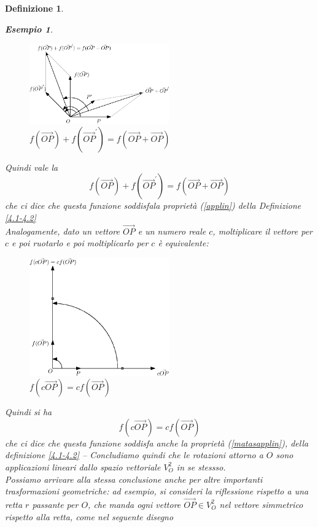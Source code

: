 \documentclass{book}
\newtheorem{definizione}{Definizione}
\newtheorem{esempio}{Esempio}
\begin{document}
\begin{definizione}
\begin{esempio}
    \clearpage
    \begin{figure}[th]
      \centering
        \includegraphics[width=6cm]{img/finiti/imgex4-2-2.eps}
      \caption{$f(\vec{OP})+f(\vec{OP}^\prime)=f(\vec{OP}+\vec{OP})$}
    \end{figure}
    Quindi vale la
    \begin{equation}
      f(\vec{OP})+f(\vec{OP}^\prime)=f(\vec{OP}+\vec{OP})
    \end{equation}
    che ci dice che questa funzione soddisfala proprietà (\ref{applin}) della Definizione \ref{4.1-4.2}\\
    Analogamente, dato un vettore $\vec{OP}$ e un numero reale $c$, moltiplicare il vettore per $c$ e poi
    ruotarlo e poi moltiplicarlo per $c$ è equivalente:
    \begin{figure}[th]
      \centering
        \includegraphics[width=6cm]{img/finiti/imgex4-2-3.eps}
      \caption{$f(c\vec{OP})=cf(\vec{OP})$}
    \end{figure}
    Quindi si ha
    \begin{equation}
      f(c\vec{OP})=cf(\vec{OP})
    \end{equation}
    che ci dice che questa funzione soddisfa anche la proprietà (\ref{matasapplin}), della definizione
    \ref{4.1-4.2} -- Concludiamo quindi che le rotazioni attorno a $O$ sono applicazioni lineari dallo
    spazio vettoriale $V_O^2$ in se stessso.\\
    Possiamo arrivare alla stessa conclusione anche per altre importanti trasformazioni geometriche: ad
    esempio, si consideri la riflessione rispetto a una retta $r$ passante per $O$, che manda ogni vettore
    $\vec{OP}\in V_O^2$ nel vettore simmetrico rispetto alla retta, come nel seguente disegno

\end{esempio}
\end{definizione}
\end{document}
